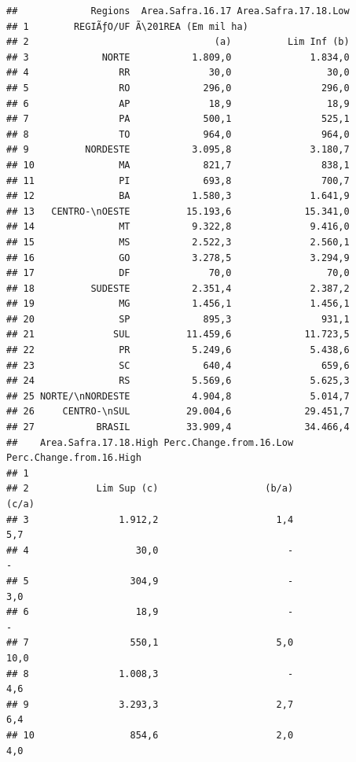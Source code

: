 \documentclass[
]{book}
\begin{document}
\begin{verbatim}
##             Regions  Area.Safra.16.17 Area.Safra.17.18.Low
## 1        REGIÃƒO/UF Ã\201REA (Em mil ha)                     
## 2                                 (a)          Lim Inf (b)
## 3             NORTE           1.809,0              1.834,0
## 4                RR              30,0                 30,0
## 5                RO             296,0                296,0
## 6                AP              18,9                 18,9
## 7                PA             500,1                525,1
## 8                TO             964,0                964,0
## 9          NORDESTE           3.095,8              3.180,7
## 10               MA             821,7                838,1
## 11               PI             693,8                700,7
## 12               BA           1.580,3              1.641,9
## 13   CENTRO-\nOESTE          15.193,6             15.341,0
## 14               MT           9.322,8              9.416,0
## 15               MS           2.522,3              2.560,1
## 16               GO           3.278,5              3.294,9
## 17               DF              70,0                 70,0
## 18          SUDESTE           2.351,4              2.387,2
## 19               MG           1.456,1              1.456,1
## 20               SP             895,3                931,1
## 21              SUL          11.459,6             11.723,5
## 22               PR           5.249,6              5.438,6
## 23               SC             640,4                659,6
## 24               RS           5.569,6              5.625,3
## 25 NORTE/\nNORDESTE           4.904,8              5.014,7
## 26     CENTRO-\nSUL          29.004,6             29.451,7
## 27           BRASIL          33.909,4             34.466,4
##    Area.Safra.17.18.High Perc.Change.from.16.Low Perc.Change.from.16.High
## 1                                                                        
## 2            Lim Sup (c)                   (b/a)                    (c/a)
## 3                1.912,2                     1,4                      5,7
## 4                   30,0                       -                        -
## 5                  304,9                       -                      3,0
## 6                   18,9                       -                        -
## 7                  550,1                     5,0                     10,0
## 8                1.008,3                       -                      4,6
## 9                3.293,3                     2,7                      6,4
## 10                 854,6                     2,0                      4,0

\end{verbatim}
\end{document}
